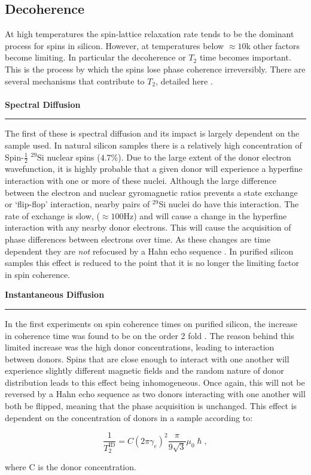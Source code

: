\subsection{Decoherence}
\label{sec:litdecoherence}

At high temperatures the spin-lattice relaxation rate tends to be the dominant process for spins in silicon.
However, at temperatures below $\approx 10$k other factors become limiting.
In particular the decoherence or $T_2$ time becomes important.
This is the process by which the spins lose phase coherence irreversibly.
There are several mechanisms that contribute to $T_2$, detailed here .
\\
\\
\textbf{Spectral Diffusion}
\\
\noindent\rule{\columnwidth}{1pt}
\begin{adjustwidth}{1.5cm}{}
The first of these is spectral diffusion and its impact is largely dependent on the sample used.
In natural silicon samples there is a relatively high concentration of Spin-$\frac{1}{2}$ $^{29}$Si nuclear spins ($4.7\%$).
Due to the large extent of the donor electron wavefunction, it is highly probable that a given donor will experience a hyperfine interaction with one or more of these nuclei.
Although the large difference between the electron and nuclear gyromagnetic ratios prevents a state exchange or `flip-flop' interaction, nearby pairs of $^{29}$Si nuclei do have this interaction.
The rate of exchange is slow, ($\approx 100$Hz) and will cause a change in the hyperfine interaction with any nearby donor electrons.
This will cause the acquisition of phase differences between electrons over time.
As these changes are time dependent they are \textit{not} refocused by a Hahn echo sequence \cite{Wolfowicz2015a}.
In purified silicon samples this effect is reduced to the point that it is no longer the limiting factor in spin coherence.
\\
\end{adjustwidth}
\textbf{Instantaneous Diffusion}
\\
\noindent\rule{\columnwidth}{1pt}
\begin{adjustwidth}{1.5cm}{}
In the first experiments on spin coherence times on purified silicon, the increase in coherence time was found to be on the order 2 fold \cite{Gordon1958}.
The reason behind this limited increase was the high donor concentrations, leading to interaction between donors.
Spins that are close enough to interact with one another will experience slightly different magnetic fields and the random nature of donor distribution leads to this effect being inhomogeneous.
Once again, this will not be reversed by a Hahn echo sequence as two donors interacting with one another will both be flipped, meaning that the phase acquisition is unchanged.
This effect is dependent on the concentration of donors in a sample according to:

\begin{equation}
\frac{1}{T_{2}^{\text{ID}}} = C(2\pi\gamma_e)^2\frac{\pi}{9\sqrt{3}}\mu_0\hslash,
\label{eq:instDiff}
\end{equation}

where C is the donor concentration.
\\
\end{adjustwidth}
